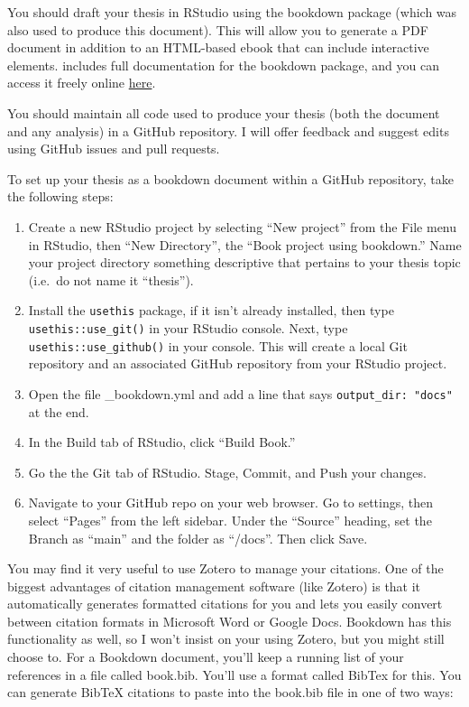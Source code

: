 \documentclass[]{tufte-book}
\providecommand{\tightlist}{%
  \setlength{\itemsep}{0pt}\setlength{\parskip}{0pt}}
\begin{document}
You should draft your thesis in RStudio using the bookdown package (which was also used to produce this document). This will allow you to generate a PDF document in addition to an HTML-based ebook that can include interactive elements. \citet{xie2016bookdown} includes full documentation for the bookdown package, and you can access it freely online \href{https://bookdown.org/yihui/bookdown/}{here}.

You should maintain all code used to produce your thesis (both the document and any analysis) in a GitHub repository. I will offer feedback and suggest edits using GitHub issues and pull requests.

To set up your thesis as a bookdown document within a GitHub repository, take the following steps:

\begin{enumerate}
\def\labelenumi{\arabic{enumi}.}
\tightlist
\item
  Create a new RStudio project by selecting ``New project'' from the File menu in RStudio, then ``New Directory'', the ``Book project using bookdown.'' Name your project directory something descriptive that pertains to your thesis topic (i.e.~do not name it ``thesis'').
\item
  Install the \texttt{usethis} package, if it isn't already installed, then type \texttt{usethis::use\_git()} in your RStudio console. Next, type \texttt{usethis::use\_github()} in your console. This will create a local Git repository and an associated GitHub repository from your RStudio project.
\item
  Open the file \_bookdown.yml and add a line that says \texttt{output\_dir:\ "docs"} at the end.
\item
  In the Build tab of RStudio, click ``Build Book.''
\item
  Go the the Git tab of RStudio. Stage, Commit, and Push your changes.
\item
  Navigate to your GitHub repo on your web browser. Go to settings, then select ``Pages'' from the left sidebar. Under the ``Source'' heading, set the Branch as ``main'' and the folder as ``/docs''. Then click Save.
\end{enumerate}

You may find it very useful to use Zotero to manage your citations. One of the biggest advantages of citation management software (like Zotero) is that it automatically generates formatted citations for you and lets you easily convert between citation formats in Microsoft Word or Google Docs. Bookdown has this functionality as well, so I won't insist on your using Zotero, but you might still choose to. For a Bookdown document, you'll keep a running list of your references in a file called book.bib. You'll use a format called BibTex for this. You can generate BibTeX citations to paste into the book.bib file in one of two ways:
\end{document}
